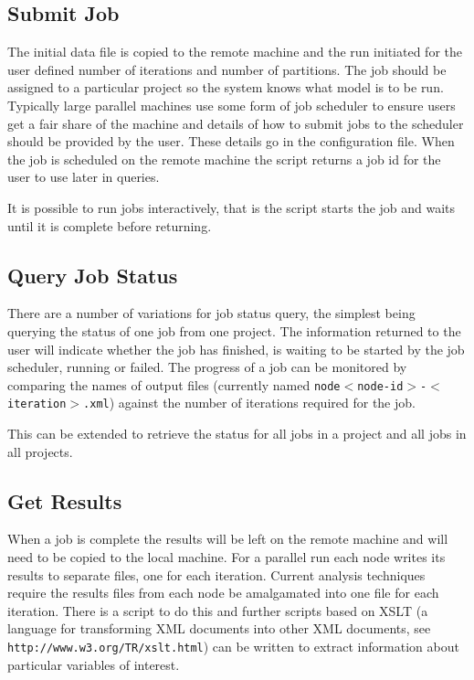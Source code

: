 \subsection{Submit Job}

The initial data file is copied to the remote machine and the run initiated for the user defined number of iterations and number of partitions. The job should be assigned to a particular project so the system knows what model is to be run.  Typically large parallel machines use some form of job scheduler to ensure users get a fair share of the machine and details of how to submit jobs to the scheduler should be provided by the user. These details go in the configuration file. When the job is scheduled on the remote machine the script returns a job id for the user to use later in queries.

It is possible to run jobs interactively, that is the script starts the job and waits until it is complete before returning.

\subsection{Query Job Status}

There are a number of variations for job status query, the simplest being querying the status of one job from one project. The information returned to the user will indicate whether the job has finished, is waiting to be started by the job scheduler, running or failed. The progress of a job can be monitored by comparing the names of output files (currently named \texttt{node$<$node-id$>$-$<$iteration$>$.xml}) against the number of iterations required for the job.

This can be extended to retrieve the status for all jobs in a project and all jobs in all projects.

\subsection{Get Results}

When a job is complete the results will be left on the remote machine and will need to be copied to the local machine. For a parallel run each node writes its results to separate files, one for each iteration. Current analysis techniques require the results files from each node be amalgamated into one file for each iteration. There is a script to do this and further scripts based on XSLT (a language for transforming XML documents into other XML documents, see \verb+http://www.w3.org/TR/xslt.html+) can be written to extract information about particular variables of interest.

